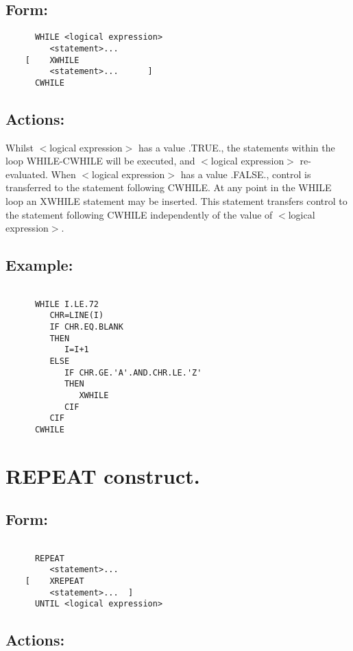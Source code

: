 \subsection{Form:}
\begin{verbatim}
      WHILE <logical expression>
         <statement>...
    [    XWHILE 
         <statement>...      ] 
      CWHILE 
\end{verbatim}
\subsection{Actions:}

Whilst $<$logical expression$>$ has a value .TRUE., the statements
within the loop WHILE-CWHILE will be executed, and $<$logical
expression$>$ re-evaluated.  When $<$logical expression$>$ has a value
.FALSE., control is transferred to the statement following CWHILE.  At
any point in the WHILE loop an XWHILE statement may be inserted.  This
statement transfers control to the statement following CWHILE
independently of the value of $<$logical expression$>$. 

\subsection{Example:}
\begin{verbatim}
      
      WHILE I.LE.72 
         CHR=LINE(I) 
         IF CHR.EQ.BLANK 
         THEN
            I=I+1 
         ELSE
            IF CHR.GE.'A'.AND.CHR.LE.'Z'
            THEN
               XWHILE
            CIF 
         CIF 
      CWHILE

\end{verbatim}
\section{REPEAT construct. }
\subsection{Form:}
\begin{verbatim}
      
      REPEAT 
         <statement>...
    [    XREPEAT
         <statement>...  ] 
      UNTIL <logical expression>

\end{verbatim}
\subsection{Actions:}

